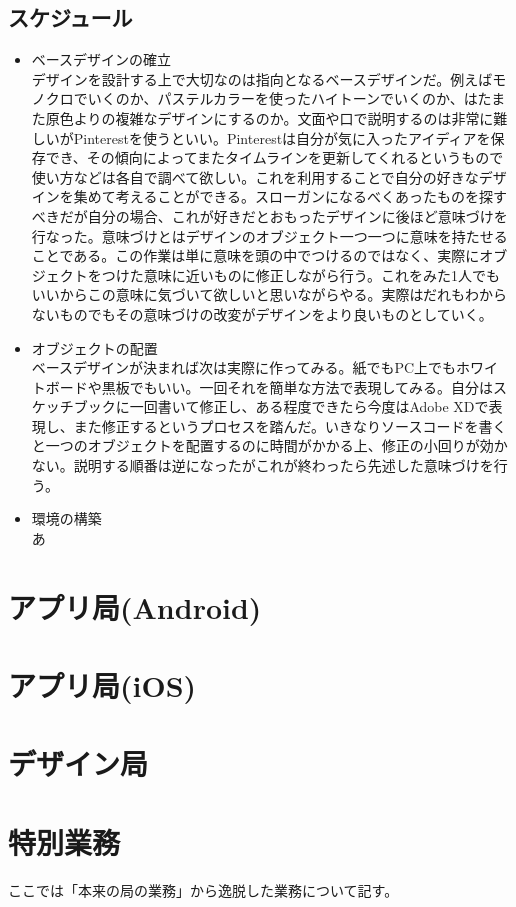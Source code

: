 \documentclass[dvipdfmx,jb5]{jarticle}
\begin{document}
 \subsection{スケジュール}
 \begin{itemize}
 \item ベースデザインの確立\\
 デザインを設計する上で大切なのは指向となるベースデザインだ。例えばモノクロでいくのか、パステルカラーを使ったハイトーンでいくのか、はたまた原色よりの複雑なデザインにするのか。文面や口で説明するのは非常に難しいがPinterestを使うといい。Pinterestは自分が気に入ったアイディアを保存でき、その傾向によってまたタイムラインを更新してくれるというもので使い方などは各自で調べて欲しい。これを利用することで自分の好きなデザインを集めて考えることができる。スローガンになるべくあったものを探すべきだが自分の場合、これが好きだとおもったデザインに後ほど意味づけを行なった。意味づけとはデザインのオブジェクト一つ一つに意味を持たせることである。この作業は単に意味を頭の中でつけるのではなく、実際にオブジェクトをつけた意味に近いものに修正しながら行う。これをみた1人でもいいからこの意味に気づいて欲しいと思いながらやる。実際はだれもわからないものでもその意味づけの改変がデザインをより良いものとしていく。
 \item オブジェクトの配置\\
 ベースデザインが決まれば次は実際に作ってみる。紙でもPC上でもホワイトボードや黒板でもいい。一回それを簡単な方法で表現してみる。自分はスケッチブックに一回書いて修正し、ある程度できたら今度はAdobe XDで表現し、また修正するというプロセスを踏んだ。いきなりソースコードを書くと一つのオブジェクトを配置するのに時間がかかる上、修正の小回りが効かない。説明する順番は逆になったがこれが終わったら先述した意味づけを行う。
 \item 環境の構築\\
 あ
 \end{itemize}
\section{アプリ局(Android)}
\section{アプリ局(iOS)}
\section{デザイン局}
\section{特別業務}
 ここでは「本来の局の業務」から逸脱した業務について記す。
\end{document}
